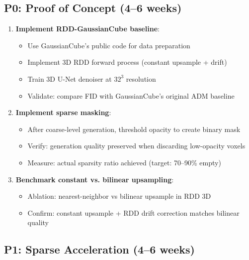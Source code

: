 \documentclass[11pt, a4paper]{article}
\begin{document}
\subsection{P0: Proof of Concept (4--6 weeks)}

\begin{enumerate}
    \item \textbf{Implement RDD-GaussianCube baseline}:
    \begin{itemize}
        \item Use GaussianCube's public code for data preparation
        \item Implement 3D RDD forward process (constant upsample + drift)
        \item Train 3D U-Net denoiser at $32^3$ resolution
        \item Validate: compare FID with GaussianCube's original ADM baseline
    \end{itemize}
    
    \item \textbf{Implement sparse masking}:
    \begin{itemize}
        \item After coarse-level generation, threshold opacity to create binary mask
        \item Verify: generation quality preserved when discarding low-opacity voxels
        \item Measure: actual sparsity ratio achieved (target: 70--90\% empty)
    \end{itemize}
    
    \item \textbf{Benchmark constant vs. bilinear upsampling}:
    \begin{itemize}
        \item Ablation: nearest-neighbor vs bilinear upsample in RDD 3D
        \item Confirm: constant upsample + RDD drift correction matches bilinear quality
    \end{itemize}
\end{enumerate}

\subsection{P1: Sparse Acceleration (4--6 weeks)}
\end{document}
